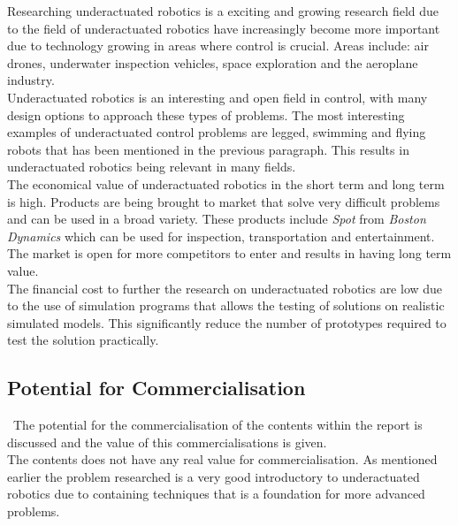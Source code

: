 Researching underactuated robotics is a exciting and growing research field due to the field of underactuated robotics have increasingly become more important due to technology growing in areas where control is crucial. Areas include: air drones, underwater inspection vehicles, space exploration and the aeroplane industry. \\

Underactuated robotics is an interesting and open field in control, with many design options to approach these types of problems. The most interesting examples of underactuated control problems are legged, swimming and flying robots that has been mentioned in the previous paragraph. This results in underactuated robotics being relevant in many fields.\\

The economical value of underactuated robotics in the short term and long term is high. Products are being brought to market that solve very difficult problems and can be used in a broad variety. These products include \textit{Spot} from \textit{Boston Dynamics} which can be used for inspection, transportation and entertainment. The market is open for more competitors to enter and results in having long term value.\\

The financial cost to further the research on underactuated robotics are low due to the use of simulation programs that allows the testing of solutions on realistic simulated models. This significantly reduce the number of prototypes required to test the solution practically. 

\subsection{Potential for Commercialisation}\
The potential for the commercialisation of the contents within the report is discussed and the value of this commercialisations is given.\\

The contents does not have any real value for commercialisation. As mentioned earlier the problem researched is a very good introductory to underactuated robotics due to containing techniques that is a foundation for more advanced problems. 




\endinput
